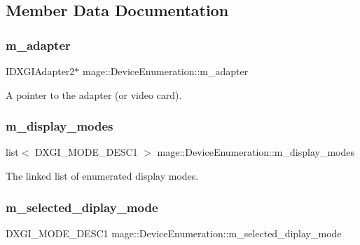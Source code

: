 \subsection{Member Data Documentation}
\hypertarget{classmage_1_1_device_enumeration_a03dfd87e73148c16dd6e6a85b4f8d8ed}{}\label{classmage_1_1_device_enumeration_a03dfd87e73148c16dd6e6a85b4f8d8ed} 
\subsubsection{\texorpdfstring{m\+\_\+adapter}{m\_adapter}}
{\footnotesize\ttfamily I\+D\+X\+G\+I\+Adapter2$\ast$ mage\+::\+Device\+Enumeration\+::m\+\_\+adapter\hspace{0.3cm}{\ttfamily [protected]}}

A pointer to the adapter (or video card). \hypertarget{classmage_1_1_device_enumeration_aae356ac476a35ce4074f61cfd75ecdbe}{}\label{classmage_1_1_device_enumeration_aae356ac476a35ce4074f61cfd75ecdbe} 
\subsubsection{\texorpdfstring{m\+\_\+display\+\_\+modes}{m\_display\_modes}}
{\footnotesize\ttfamily list$<$ D\+X\+G\+I\+\_\+\+M\+O\+D\+E\+\_\+\+D\+E\+S\+C1 $>$ mage\+::\+Device\+Enumeration\+::m\+\_\+display\+\_\+modes\hspace{0.3cm}{\ttfamily [protected]}}

The linked list of enumerated display modes. \hypertarget{classmage_1_1_device_enumeration_aadeabdccd5f14eb037de31a2a05a4d82}{}\label{classmage_1_1_device_enumeration_aadeabdccd5f14eb037de31a2a05a4d82} 
\subsubsection{\texorpdfstring{m\+\_\+selected\+\_\+diplay\+\_\+mode}{m\_selected\_diplay\_mode}}
{\footnotesize\ttfamily D\+X\+G\+I\+\_\+\+M\+O\+D\+E\+\_\+\+D\+E\+S\+C1 mage\+::\+Device\+Enumeration\+::m\+\_\+selected\+\_\+diplay\+\_\+mode\hspace{0.3cm}{\ttfamily [protected]}}

